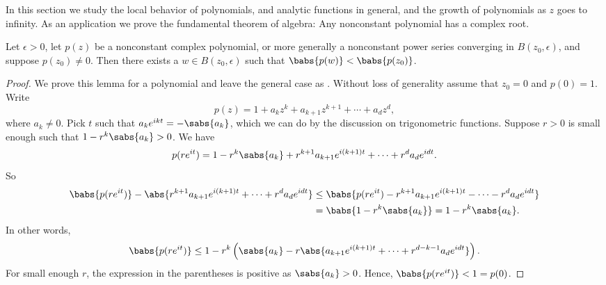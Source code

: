 
In this section we study the local behavior of polynomials,
and analytic functions in general, and the growth of polynomials as $z$ goes to infinity.
As an application we prove the fundamental theorem of algebra: Any nonconstant polynomial
has a complex root.

\begin{lemma} \label{lemma:polyalwaysgetssmaller}
Let $\epsilon > 0$,
let $p(z)$ be a nonconstant complex polynomial, or more generally
a nonconstant power series converging in $B(z_0,\epsilon)$,
and suppose $p(z_0) \not= 0$.
Then there exists a $w \in B(z_0,\epsilon)$ such that $\babs{p(w)} < \babs{p(z_0)}$.
\end{lemma}

\begin{proof}
We prove this lemma for a polynomial and leave the general case as
.
Without loss of generality assume that $z_0 = 0$ and $p(0) = 1$.  Write
\begin{equation*}
p(z) = 1+a_kz^k + a_{k+1}z^{k+1} + \cdots + a_d z^d ,
\end{equation*}
where $a_k \not= 0$.  Pick $t$ such that $a_k e^{ikt} = -\sabs{a_k}$, which
we can do by the discussion on trigonometric functions.  Suppose
$r > 0$ is small enough such that
$1-r^k \sabs{a_k} > 0$.  We have
\begin{equation*}
p(r e^{it}) =
1-r^k \sabs{a_k} + r^{k+1}a_{k+1}e^{i(k+1)t} + \cdots + r^{d}a_{d}e^{idt} .
\end{equation*}
So
\begin{equation*}
\begin{split}
\babs{
p(r e^{it}) } - \abs{
r^{k+1}a_{k+1}e^{i(k+1)t} + \cdots + r^{d}a_{d}e^{idt}
}
&
\leq
\babs{
p(r e^{it}) 
- r^{k+1}a_{k+1}e^{i(k+1)t} - \cdots - r^{d}a_{d}e^{idt}
}
\\
&
=
\babs{
1-r^k \sabs{a_k}
}
=
1-r^k \sabs{a_k} .
\end{split}
\end{equation*}
In other words,
\begin{equation*}
\babs{
p(r e^{it}) }
\leq
1-r^k \left( \sabs{a_k}
-
r
\abs{
a_{k+1}e^{i(k+1)t} + \cdots + r^{d-k-1}a_{d}e^{idt}
}
\right) .
\end{equation*}
For small enough $r$, the expression in the parentheses is positive
as $\sabs{a_k} > 0$.  Hence, $\babs{p(re^{it})} < 1 = p(0)$.
\end{proof}

